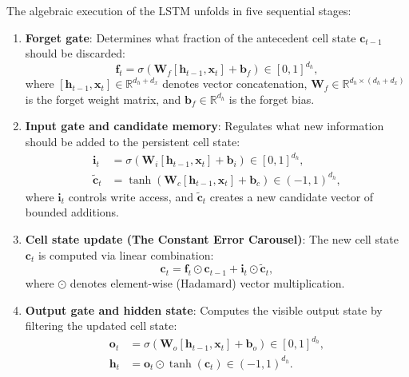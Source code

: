 \documentclass[../../../main.tex]{subfiles}
\begin{document}
The algebraic execution of the LSTM unfolds in five sequential stages:
\begin{enumerate}
    \item \textbf{Forget gate}: Determines what fraction of the antecedent cell state $\mathbf{c}_{t-1}$ should be discarded:
    \begin{equation}
    \mathbf{f}_t = \sigma\left(\mathbf{W}_f \left[\mathbf{h}_{t-1}, \mathbf{x}_t\right] + \mathbf{b}_f\right) \in [0, 1]^{d_h},
    \label{eq:lstm_forget_gate}
    \end{equation}
    where $\left[\mathbf{h}_{t-1}, \mathbf{x}_t\right] \in \mathbb{R}^{d_h + d_x}$ denotes vector concatenation, $\mathbf{W}_f \in \mathbb{R}^{d_h \times (d_h + d_x)}$ is the forget weight matrix, and $\mathbf{b}_f \in \mathbb{R}^{d_h}$ is the forget bias.
    
    \item \textbf{Input gate and candidate memory}: Regulates what new information should be added to the persistent cell state:
    \begin{align}
    \mathbf{i}_t & = \sigma\left(\mathbf{W}_i \left[\mathbf{h}_{t-1}, \mathbf{x}_t\right] + \mathbf{b}_i\right) \in [0, 1]^{d_h}, \label{eq:lstm_input_gate} \\
    \tilde{\mathbf{c}}_t & = \tanh\left(\mathbf{W}_c \left[\mathbf{h}_{t-1}, \mathbf{x}_t\right] + \mathbf{b}_c\right) \in (-1, 1)^{d_h}, \label{eq:lstm_candidate_cell}
    \end{align}
    where $\mathbf{i}_t$ controls write access, and $\tilde{\mathbf{c}}_t$ creates a new candidate vector of bounded additions.
    
    \item \textbf{Cell state update (The Constant Error Carousel)}: The new cell state $\mathbf{c}_t$ is computed via linear combination:
    \begin{equation}
    \mathbf{c}_t = \mathbf{f}_t \odot \mathbf{c}_{t-1} + \mathbf{i}_t \odot \tilde{\mathbf{c}}_t,
    \label{eq:lstm_cell_state_update}
    \end{equation}
    where $\odot$ denotes element-wise (Hadamard) vector multiplication.
    
    \item \textbf{Output gate and hidden state}: Computes the visible output state by filtering the updated cell state:
    \begin{align}
    \mathbf{o}_t & = \sigma\left(\mathbf{W}_o \left[\mathbf{h}_{t-1}, \mathbf{x}_t\right] + \mathbf{b}_o\right) \in [0, 1]^{d_h}, \label{eq:lstm_output_gate} \\
    \mathbf{h}_t & = \mathbf{o}_t \odot \tanh\left(\mathbf{c}_t\right) \in (-1, 1)^{d_h}. \label{eq:lstm_hidden_output}
    \end{align}
\end{enumerate}
\end{document}
